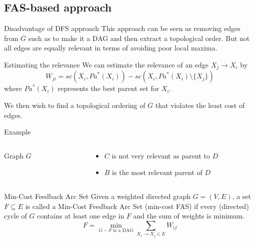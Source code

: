 \subsection{FAS-based approach}
	\begin{frame}
		\begin{block}{Disadvantage of DFS approach}
			This approach can be seen as removing edges from $\overline G$ such as to make it a DAG and then extract a topological order. But not all edges are \alert{equally relevant} in terms of avoiding poor local maxima.
		\end{block}		
	\end{frame}
	
	\begin{frame}
		\begin{block}{Estimating the relevance}
			We can estimate the relevance of an edge $X_j \rightarrow X_i$ by
			\[ W_{ji} = {sc}( X_i , {Pa}^*( X_i ) ) - {sc}( X_i , {Pa}^*( X_i ) \setminus \{ X_j \} ) \]
			where ${Pa}^*( X_i )$ represents the \alert{best parent set} for $X_i$.\\
		\end{block}
		We then wish to find a topological ordering of $\overline G$ that violates the least cost of edges.
	\end{frame}
	
	\begin{frame}{Example}
		\begin{columns}
			\begin{column}{.4\textwidth}
				\begin{figure}
					\centering
					
				\end{figure}
				\centering
				Graph $\overline G$
			\end{column}
			\begin{column}{.5\textwidth}
				\begin{itemize}
					\item $C$ is not very relevant as parent to $D$
					\item $B$ is the most relevant parent of $D$
				\end{itemize}
			\end{column}
		\end{columns}
	\end{frame}
	
	\begin{frame}
		\begin{block}{Min-Cost Feedback Arc Set}
			 Given a weighted directed graph $G = ( V , E )$, a set $F \subseteq E$ is called a Min-Cost Feedback Arc Set (min-cost FAS) if every (directed) cycle of $G$ contains at least one edge in $F$ and the sum of weights is minimum.
				\[ F = \min_{G-F \text{ is a DAG}} \sum_{X_i \rightarrow X_j \in E} W_{ij} \]
		\end{block}
	\end{frame}
	

